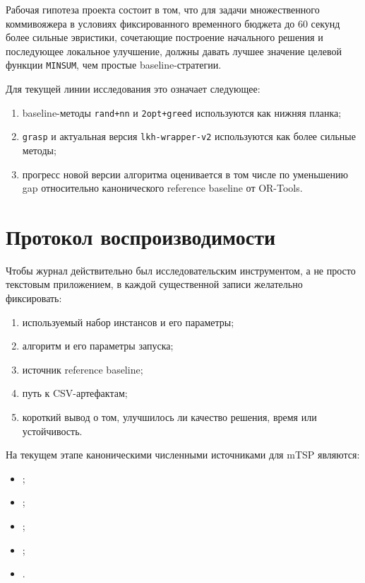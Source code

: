 \documentclass[a4paper,12pt]{article}
\begin{document}
Рабочая гипотеза проекта состоит в том, что для задачи множественного коммивояжера в условиях фиксированного временного бюджета до 60 секунд более сильные эвристики, сочетающие построение начального решения и последующее локальное улучшение, должны давать лучшее значение целевой функции \texttt{MINSUM}, чем простые baseline-стратегии.

Для текущей линии исследования это означает следующее:
\begin{enumerate}[label=\arabic*.]
  \item baseline-методы \texttt{rand+nn} и \texttt{2opt+greed} используются как нижняя планка;
  \item \texttt{grasp} и актуальная версия \texttt{lkh-wrapper-v2} используются как более сильные методы;
  \item прогресс новой версии алгоритма оценивается в том числе по уменьшению gap относительно канонического reference baseline от OR-Tools.
\end{enumerate}

\section{Протокол воспроизводимости}

Чтобы журнал действительно был исследовательским инструментом, а не просто текстовым приложением, в каждой существенной записи желательно фиксировать:
\begin{enumerate}[label=\arabic*.]
  \item используемый набор инстансов и его параметры;
  \item алгоритм и его параметры запуска;
  \item источник reference baseline;
  \item путь к CSV-артефактам;
  \item короткий вывод о том, улучшилось ли качество решения, время или устойчивость.
\end{enumerate}

На текущем этапе каноническими численными источниками для mTSP являются:
\begin{itemize}
  \item {};
  \item {};
  \item {};
  \item {};
  \item {}.
\end{itemize}
\end{document}
